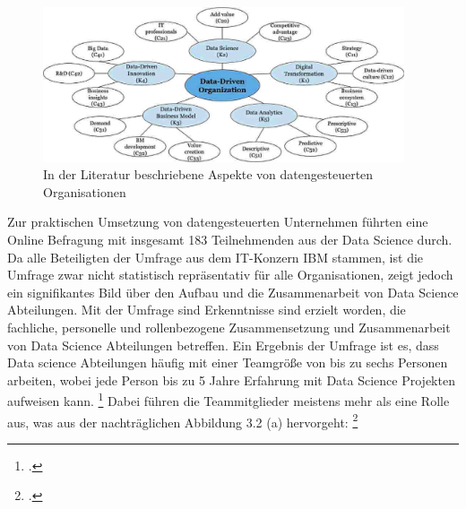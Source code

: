 \begin{figure}[htb]
    \centering
    \includegraphics[width=0.95\textwidth]{graphics/ddo aspects.png}
    \caption{In der Literatur beschriebene Aspekte von datengesteuerten Organisationen}
    \label{fig:DDOs aspects}
\end{figure}

Zur praktischen Umsetzung von datengesteuerten Unternehmen führten  eine Online Befragung mit insgesamt 183 Teilnehmenden aus der Data Science durch.
Da alle Beteiligten der Umfrage aus dem IT-Konzern IBM stammen, ist die Umfrage zwar nicht statistisch repräsentativ für alle Organisationen, zeigt jedoch ein signifikantes Bild über den Aufbau und die Zusammenarbeit von Data Science Abteilungen.
Mit der Umfrage sind Erkenntnisse sind erzielt worden, die fachliche, personelle und rollenbezogene Zusammensetzung und Zusammenarbeit von Data Science Abteilungen betreffen.
Ein Ergebnis der Umfrage ist es, dass Data science Abteilungen häufig mit einer Teamgröße von bis zu sechs Personen arbeiten, wobei jede Person bis zu 5 Jahre Erfahrung mit Data Science Projekten aufweisen kann. \footcite[Vgl.][S. 7]{Zhang.2020b}
Dabei führen die Teammitglieder meistens mehr als eine Rolle aus, was aus der nachträglichen Abbildung 3.2 (a) hervorgeht: \footcite[Vgl.][S. 7]{Zhang.2020b}

